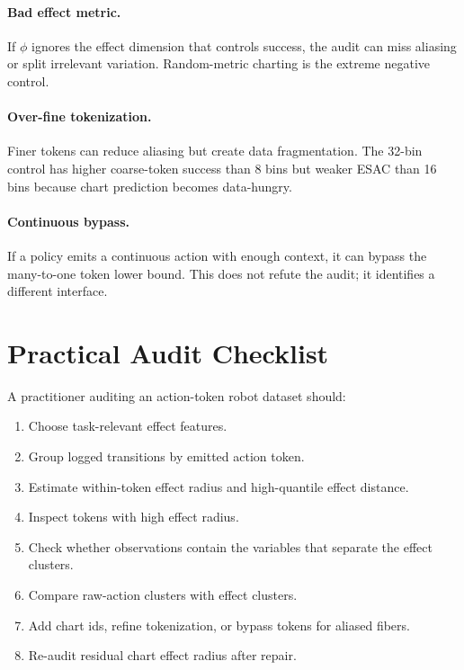 \documentclass{article}
\begin{document}
\paragraph{Bad effect metric.}
If $\phi$ ignores the effect dimension that controls success, the audit can
miss aliasing or split irrelevant variation. Random-metric charting is the
extreme negative control.

\paragraph{Over-fine tokenization.}
Finer tokens can reduce aliasing but create data fragmentation. The 32-bin
control has higher coarse-token success than 8 bins but weaker ESAC than 16
bins because chart prediction becomes data-hungry.

\paragraph{Continuous bypass.}
If a policy emits a continuous action with enough context, it can bypass the
many-to-one token lower bound. This does not refute the audit; it identifies a
different interface.

\section{Practical Audit Checklist}

A practitioner auditing an action-token robot dataset should:

\begin{enumerate}[leftmargin=1.4em]
    \item Choose task-relevant effect features.
    \item Group logged transitions by emitted action token.
    \item Estimate within-token effect radius and high-quantile effect
    distance.
    \item Inspect tokens with high effect radius.
    \item Check whether observations contain the variables that separate the
    effect clusters.
    \item Compare raw-action clusters with effect clusters.
    \item Add chart ids, refine tokenization, or bypass tokens for aliased
    fibers.
    \item Re-audit residual chart effect radius after repair.
\end{enumerate}
\end{document}
